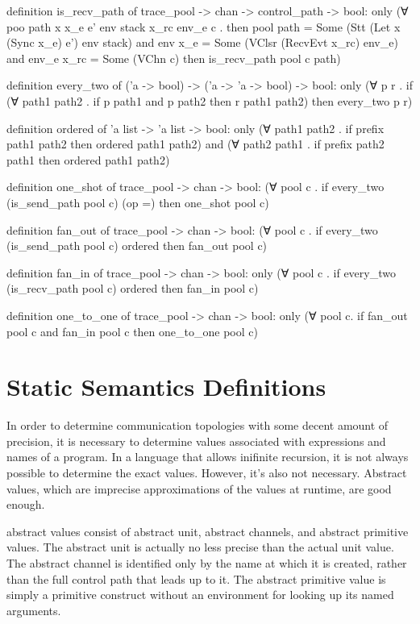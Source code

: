 definition is_recv_path of trace_pool -> chan -> control_path -> bool:
only
(∀ poo path x x_e e' env stack x_rc env_e c .
  then
    pool path = Some (Stt (Let x (Sync x_e) e') env stack) and
    env x_e = Some (VClsr (RecvEvt x_rc) env_e) and
    env_e x_rc = Some (VChn c)
  then
    is_recv_path pool c path)

definition every_two of ('a -> bool) -> ('a -> 'a -> bool) -> bool:
only
(∀ p r .
  if
    (∀ path1 path2 . if p path1 and p path2 then r path1 path2)
  then
    every_two p r)

definition ordered of 'a list -> 'a list -> bool:
only
(∀ path1 path2 . if prefix path1 path2 then
  ordered path1 path2) and
(∀ path2 path1 . if prefix path2 path1 then
  ordered path1 path2)

definition one_shot of trace_pool -> chan -> bool:
(∀ pool c .
  if
    every_two (is_send_path pool c) (op =)
  then
    one_shot pool c)

definition fan_out of trace_pool -> chan -> bool:
(∀ pool c .
  if
    every_two (is_send_path pool c) ordered
  then
    fan_out pool c)
  
definition fan_in of trace_pool -> chan -> bool:
only
(∀ pool c .
  if
    every_two (is_recv_path pool c) ordered
  then
    fan_in pool c)

definition one_to_one of trace_pool -> chan -> bool:
only
(∀ pool c.
  if
    fan_out pool c and 
    fan_in pool c
  then
    one_to_one pool c)

\section{Static Semantics Definitions}

In order to determine communication topologies with some decent amount of precision, it is
necessary to determine values associated with expressions and names of a program.  In a
language that allows inifinite recursion, it is not always possible to determine the exact
values.  However, it's also not necessary.  Abstract values, which are imprecise approximations
of the values at runtime, are good enough.

abstract values consist of abstract unit, abstract channels, and abstract primitive values.
The abstract unit is actually no less precise than the actual unit value.  The abstract channel
is identified only by the name at which it is created, rather than the full control path that
leads up to it.  The abstract primitive value is simply a primitive construct without an
environment for looking up its named arguments. 

